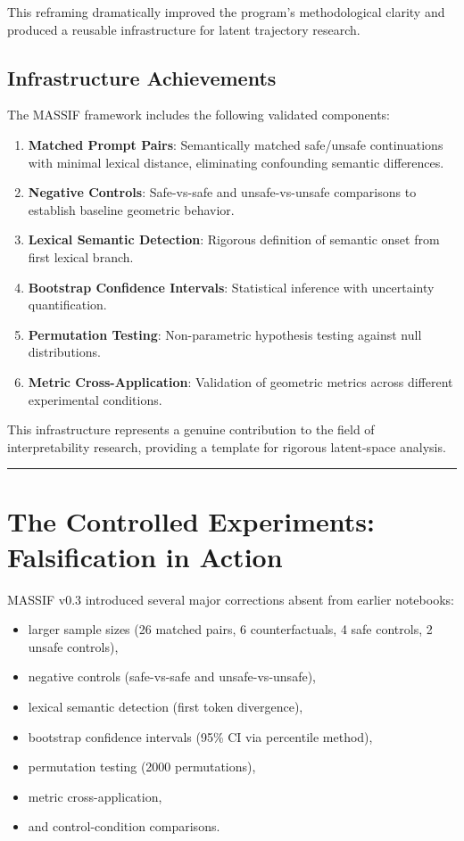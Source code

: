 \documentclass[12pt,a4paper]{article}
\begin{document}
This reframing dramatically improved the program's methodological clarity and produced a reusable infrastructure for latent trajectory research.

\subsection*{Infrastructure Achievements}

The MASSIF framework includes the following validated components:

\begin{enumerate}
    \item \textbf{Matched Prompt Pairs}: Semantically matched safe/unsafe continuations with minimal lexical distance, eliminating confounding semantic differences.
    \item \textbf{Negative Controls}: Safe-vs-safe and unsafe-vs-unsafe comparisons to establish baseline geometric behavior.
    \item \textbf{Lexical Semantic Detection}: Rigorous definition of semantic onset from first lexical branch.
    \item \textbf{Bootstrap Confidence Intervals}: Statistical inference with uncertainty quantification.
    \item \textbf{Permutation Testing}: Non-parametric hypothesis testing against null distributions.
    \item \textbf{Metric Cross-Application}: Validation of geometric metrics across different experimental conditions.
\end{enumerate}

This infrastructure represents a genuine contribution to the field of interpretability research, providing a template for rigorous latent-space analysis.

\medskip
\hrule
\medskip

\section{The Controlled Experiments: Falsification in Action}

MASSIF v0.3 introduced several major corrections absent from earlier notebooks:
\begin{itemize}
    \item larger sample sizes (26 matched pairs, 6 counterfactuals, 4 safe controls, 2 unsafe controls),
    \item negative controls (safe-vs-safe and unsafe-vs-unsafe),
    \item lexical semantic detection (first token divergence),
    \item bootstrap confidence intervals (95\% CI via percentile method),
    \item permutation testing (2000 permutations),
    \item metric cross-application,
    \item and control-condition comparisons.
\end{itemize}
\end{document}
